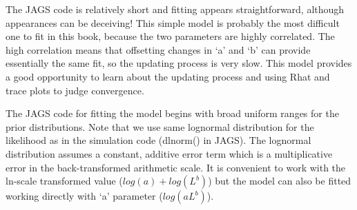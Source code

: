 \documentclass[
]{krantz}
\begin{document}
The JAGS code is relatively short and fitting appears straightforward, although appearances can be deceiving! This simple model is probably the most difficult one to fit in this book, because the two parameters are highly correlated. The high correlation means that offsetting changes in `a' and `b' can provide essentially the same fit, so the updating process is very slow. This model provides a good opportunity to learn about the updating process and using Rhat and trace plots to judge convergence.

The JAGS code for fitting the model begins with broad uniform ranges for the prior distributions. Note that we use same lognormal distribution for the likelihood as in the simulation code (dlnorm() in JAGS). The lognormal distribution assumes a constant, additive error term which is a multiplicative error in the back-transformed arithmetic scale. It is convenient to work with the ln-scale transformed value (\(log(a)+log(L^b)\)) but the model can also be fitted working directly with `a' parameter (\(log(aL^b)\)).
\end{document}
